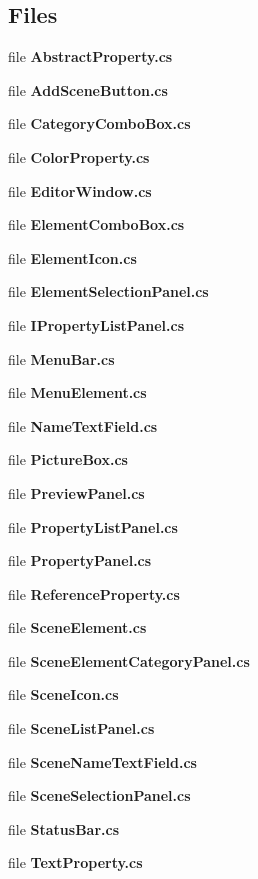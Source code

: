 \subsection*{Files}
\begin{DoxyCompactItemize}
\item 
file {\bfseries Abstract\-Property.\-cs}
\item 
file {\bfseries Add\-Scene\-Button.\-cs}
\item 
file {\bfseries Category\-Combo\-Box.\-cs}
\item 
file {\bfseries Color\-Property.\-cs}
\item 
file {\bfseries Editor\-Window.\-cs}
\item 
file {\bfseries Element\-Combo\-Box.\-cs}
\item 
file {\bfseries Element\-Icon.\-cs}
\item 
file {\bfseries Element\-Selection\-Panel.\-cs}
\item 
file {\bfseries I\-Property\-List\-Panel.\-cs}
\item 
file {\bfseries Menu\-Bar.\-cs}
\item 
file {\bfseries Menu\-Element.\-cs}
\item 
file {\bfseries Name\-Text\-Field.\-cs}
\item 
file {\bfseries Picture\-Box.\-cs}
\item 
file {\bfseries Preview\-Panel.\-cs}
\item 
file {\bfseries Property\-List\-Panel.\-cs}
\item 
file {\bfseries Property\-Panel.\-cs}
\item 
file {\bfseries Reference\-Property.\-cs}
\item 
file {\bfseries Scene\-Element.\-cs}
\item 
file {\bfseries Scene\-Element\-Category\-Panel.\-cs}
\item 
file {\bfseries Scene\-Icon.\-cs}
\item 
file {\bfseries Scene\-List\-Panel.\-cs}
\item 
file {\bfseries Scene\-Name\-Text\-Field.\-cs}
\item 
file {\bfseries Scene\-Selection\-Panel.\-cs}
\item 
file {\bfseries Status\-Bar.\-cs}
\item 
file {\bfseries Text\-Property.\-cs}
\end{DoxyCompactItemize}
